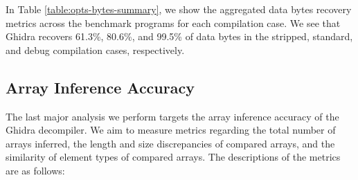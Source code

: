 \documentclass[a4paper,twoside]{article}
\begin{document}


In Table \ref{table:opts-bytes-summary}, we show the aggregated data bytes recovery metrics across the benchmark programs for each compilation case. We see that Ghidra recovers 61.3\%, 80.6\%, and 99.5\% of data bytes in the stripped, standard, and debug compilation cases, respectively.

\subsection{Array Inference Accuracy}

The last major analysis we perform targets the array inference accuracy of the Ghidra decompiler. We aim to measure metrics regarding the total number of arrays inferred, the length and size discrepancies of compared arrays, and the similarity of element types of compared arrays. The descriptions of the metrics are as follows:
\end{document}
